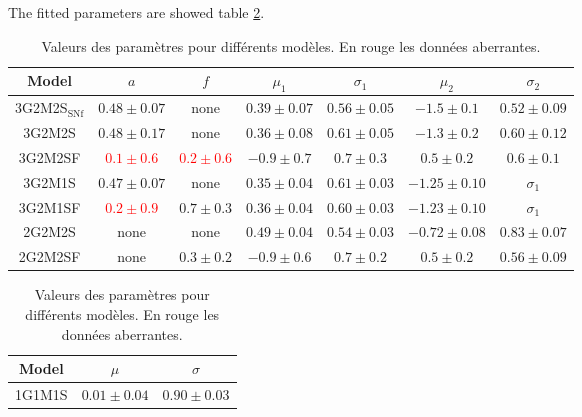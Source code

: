 \documentclass[]{aa} %
\begin{document}
The fitted parameters are showed table \ref{tab:val}.

\begin{table}[htbp!]
    \centering
    \caption{Valeurs des paramètres pour différents modèles. En rouge les
    données aberrantes.}
    \label{tab:val}
    \begin{tabular}{c c c c c c c}\hline\hline

        Model & $a$ & $f$ & $\mu_1$ & $\sigma_1$ & $\mu_2$ &
        $\sigma_2$ \\\hline

        3G2M2S$_{\mathrm{SNf}}$ & $0.48 \pm 0.07$ & none & $0.39 \pm 0.07$ &
        $0.56 \pm 0.05$ & $-1.5 \pm 0.1$ & $0.52 \pm 0.09$ \\

        3G2M2S & $0.48 \pm 0.17$ & none & $0.36 \pm 0.08$ & $0.61 \pm 0.05$ &
        $-1.3 \pm 0.2$ & $0.60 \pm 0.12$ \\

        3G2M2SF & \textcolor{red}{$0.1 \pm 0.6$} & \textcolor{red}{$0.2 \pm
        0.6$} & $-0.9 \pm 0.7$ & $0.7 \pm 0.3$ & $0.5 \pm 0.2$ & $0.6 \pm 0.1$
        \\

        3G2M1S & $0.47 \pm 0.07$ & none & $0.35 \pm 0.04$ & $0.61 \pm 0.03$ &
        $-1.25 \pm 0.10$ & $\sigma_1$ \\

        3G2M1SF & \textcolor{red}{$0.2 \pm 0.9$} & $0.7 \pm 0.3$ & $0.36 \pm
        0.04$ & $0.60 \pm 0.03$ & $-1.23 \pm 0.10$ & $\sigma_1$ \\

        2G2M2S & none & none & $0.49 \pm 0.04$ & $0.54 \pm 0.03$ & $-0.72 \pm
        0.08$ & $0.83 \pm 0.07$ \\
        
        2G2M2SF & none & $0.3 \pm 0.2$ & $-0.9 \pm 0.6$ & $0.7 \pm 0.2$ & $0.5
        \pm 0.2$ & $0.56 \pm 0.09$ \\\hline

    \end{tabular} \bigbreak

\begin{tabular}{c c c}\hline\hline

    Model & $\mu$ & $\sigma$ \\\hline

    1G1M1S & $0.01 \pm 0.04$ & $0.90 \pm 0.03$ \\\hline

\end{tabular} \bigbreak


\end{table}
\end{document}
